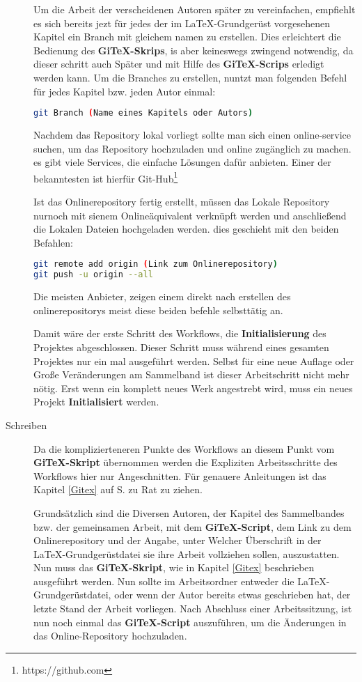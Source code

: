 \documentclass[12pt,a4paper]{scrartcl}
\begin{document}
\begin{description}
Um die Arbeit der verscheidenen Autoren später zu vereinfachen, empfiehlt es sich bereits jezt für jedes der im \LaTeX -Grundgerüst vorgesehenen Kapitel ein Branch mit gleichem namen zu erstellen. Dies erleichtert die Bedienung des \textbf{GiTeX-Skrips}, is aber keineswegs zwingend notwendig, da dieser schritt auch Später und mit Hilfe des \textbf{GiTeX-Scrips} erledigt werden kann. Um die Branches zu erstellen, nuntzt man folgenden Befehl für jedes Kapitel bzw. jeden Autor einmal:

\begin{lstlisting}[language=bash]
git Branch (Name eines Kapitels oder Autors)
\end{lstlisting}


Nachdem das Repository lokal vorliegt sollte man sich einen online-service suchen, um das Repository hochzuladen und online zugänglich zu machen. es gibt viele Services, die einfache Lösungen dafür anbieten. Einer der bekanntesten ist hierfür Git-Hub\footnote{https://github.com}

Ist das Onlinerepository fertig erstellt, müssen das Lokale Repository nurnoch mit sienem Onlineäquivalent verknüpft werden und anschließend die Lokalen Dateien hochgeladen werden. dies geschieht mit den beiden Befahlen:
\begin{lstlisting}[language=bash]
git remote add origin (Link zum Onlinerepository)
git push -u origin --all
\end{lstlisting} 
Die meisten Anbieter, zeigen einem direkt nach erstellen des onlinerepositorys meist diese beiden befehle selbsttätig an.

Damit wäre der erste Schritt des Workflows, die \textbf{Initialisierung} des Projektes abgeschlossen. Dieser Schritt muss während eines gesamten Projektes nur ein mal ausgeführt werden. Selbst für eine neue Auflage oder Große Veränderungen am Sammelband ist dieser Arbeitschritt nicht mehr nötig. Erst wenn ein komplett neues Werk angestrebt wird, muss ein neues Projekt \textbf{Initialisiert} werden.
\item[Schreiben] 
Da die komplizierteneren Punkte des Workflows an diesem Punkt vom  \textbf{GiTeX-Skript} übernommen werden die Expliziten Arbeitsschritte des Workflows hier nur Angeschnitten. Für genauere Anleitungen ist das Kapitel \ref{Gitex} auf S. \pageref{Gitex} zu Rat zu ziehen.

Grundsätzlich sind die Diversen Autoren, der Kapitel des Sammelbandes bzw. der gemeinsamen Arbeit, mit dem \textbf{GiTeX-Script}, dem Link zu dem Onlinerepository und der Angabe, unter Welcher Überschrift in der \LaTeX -Grundgerüstdatei sie ihre Arbeit vollziehen sollen, auszustatten. Nun muss das \textbf{GiTeX-Skript}, wie in Kapitel \ref{Gitex} beschrieben ausgeführt werden. Nun sollte im Arbeitsordner entweder die \LaTeX -Grundgerüstdatei, oder wenn der Autor bereits etwas geschrieben hat, der letzte Stand der Arbeit vorliegen. Nach Abschluss einer Arbeitssitzung, ist nun noch einmal das \textbf{GiTeX-Script} auszuführen, um die Änderungen in das Online-Repository hochzuladen.


\end{description}
\end{document}
